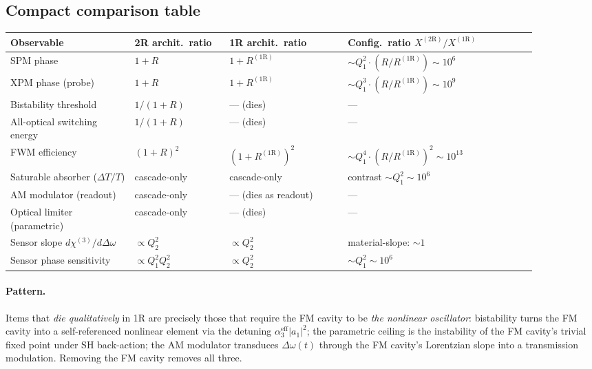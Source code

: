 \documentclass[11pt,a4paper]{article}
\newcommand{\chithree}{\chi^{(3)}}
\newcommand{\Dom}{\Delta\omega}
\begin{document}
\subsection*{Compact comparison table}

\begin{center}\small
\begin{tabular}{p{0.21\linewidth}p{0.16\linewidth}p{0.20\linewidth}p{0.32\linewidth}}
\toprule
Observable & 2R archit.\ ratio & 1R archit.\ ratio & Config.\ ratio $X^{(2\mathrm R)}/X^{(1\mathrm R)}$ \\
\midrule
SPM phase
 & $1+R$
 & $1+R^{(1\mathrm R)}$
 & $\sim Q_1^{2}\cdot(R/R^{(1\mathrm R)})\sim 10^{6}$ \\[2pt]
XPM phase (probe)
 & $1+R$
 & $1+R^{(1\mathrm R)}$
 & $\sim Q_1^{3}\cdot(R/R^{(1\mathrm R)})\sim 10^{9}$ \\[2pt]
Bistability threshold
 & $1/(1+R)$
 & --- (dies)
 & --- \\[2pt]
All-optical switching energy
 & $1/(1+R)$
 & --- (dies)
 & --- \\[2pt]
FWM efficiency
 & $(1+R)^{2}$
 & $(1+R^{(1\mathrm R)})^{2}$
 & $\sim Q_1^{4}\cdot(R/R^{(1\mathrm R)})^{2}\sim 10^{13}$ \\[2pt]
\midrule
Saturable absorber ($\Delta T/T$)
 & cascade-only
 & cascade-only
 & contrast $\sim Q_1^{2}\sim 10^{6}$ \\[2pt]
AM modulator (readout)
 & cascade-only
 & --- (dies as readout)
 & --- \\[2pt]
Optical limiter (parametric)
 & cascade-only
 & --- (dies)
 & --- \\[2pt]
Sensor slope $d\chithree/d\Dom$
 & $\propto Q_2^{2}$
 & $\propto Q_2^{2}$
 & material-slope: $\sim 1$ \\[2pt]
Sensor phase sensitivity
 & $\propto Q_1^{2}Q_2^{2}$
 & $\propto Q_2^{2}$
 & $\sim Q_1^{2}\sim 10^{6}$ \\
\bottomrule
\end{tabular}
\end{center}

\paragraph{Pattern.}
Items that \emph{die qualitatively} in 1R are precisely those that
require the FM cavity to be \emph{the nonlinear oscillator}: bistability
turns the FM cavity into a self-referenced nonlinear element via the
detuning $\alpha_3^\text{eff}|a_1|^{2}$; the parametric ceiling is the
instability of the FM cavity's trivial fixed point under SH back-action;
the AM modulator transduces $\Dom(t)$ through the FM cavity's Lorentzian
slope into a transmission modulation.  Removing the FM cavity removes
all three.
\end{document}
